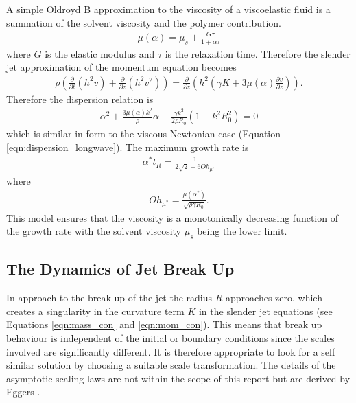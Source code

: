 \documentclass[11pt]{article}
\newcommand{\pd}[2]{\frac{\partial #1}{\partial #2}}
\begin{document}
A simple Oldroyd B approximation to the viscosity of a viscoelastic fluid is a summation of the solvent viscosity and the polymer contribution. 
\begin{align}
\mu(\alpha) = \mu_s + \frac{G \tau}{1 + \alpha \tau}
\end{align}
where $G$ is the elastic modulus and $\tau$  is the relaxation time. Therefore the slender jet approximation of the momentum equation becomes
\begin{align*}
\rho \left( \pd{}{t} (h^2v) + \pd{}{z} (h^2v^2) \right) = \pd{}{z} \left(h^2 \left( \gamma K + 3 \mu(\alpha) \pd{v}{z}\right) \right).
\end{align*}
Therefore the dispersion relation is
\begin{align}
\alpha^2 + \frac{3 \mu(\alpha) k^2}{\rho}\alpha - \frac{\gamma k^2}{2 \rho R_0}(1 - k^2R_0^2) = 0
\label{eqn:dispersion_viscoelastic}
\end{align}
which is similar in form to the viscous Newtonian case (Equation \ref{eqn:dispersion_longwave}). The maximum growth rate is
\begin{align*}
\alpha^* t_R = \frac{1}{2 \sqrt{2} + 6 Oh_{\mu^*}}
\end{align*}
where
\begin{align*}
Oh_{\mu^*} = \frac{\mu(\alpha^*)}{\sqrt{\rho \gamma R_0}}.
\end{align*}
This model ensures that the viscosity is a monotonically decreasing function of the growth rate with the solvent viscosity $\mu_s$ being the lower limit. 

\subsection{The Dynamics of Jet Break Up}
In approach to the break up of the jet the radius $R$ approaches zero, which creates a singularity in the curvature term $K$ in the slender jet equations (see Equations \ref{eqn:mass_con} and \ref{eqn:mom_con}). This means that break up behaviour is independent of the initial or boundary conditions since the scales involved are significantly different. It is therefore appropriate to look for a self similar solution by choosing a suitable scale transformation. The details of the asymptotic scaling laws are not within the scope of this report but are derived by Eggers \cite{eggers2005drop}.
\end{document}
